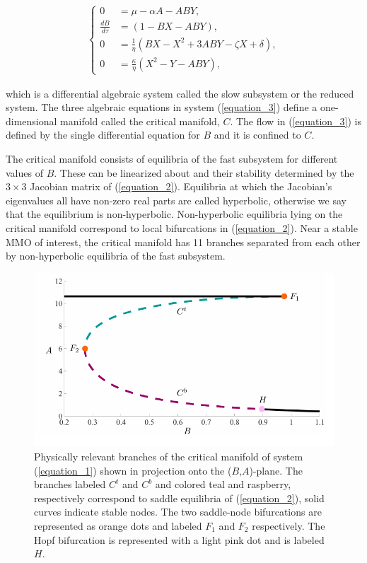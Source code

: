 \documentclass{ws-ijbc}
\begin{document}
 \begin{equation}
\begin{aligned}
\begin{cases}
0 &= \mu - \alpha A - ABY, \\
\frac{dB}{d\tau} &= (1-BX - ABY), \\
0 &= \frac{1}{\eta}(BX - X^2 +3ABY - \zeta X + \delta), \\
0 &= \frac{\kappa}{\eta}(X^2 - Y - ABY),
\end{cases}
\end{aligned}
\label{equation_3}
\end{equation}
    
\noindent
which is a differential algebraic system called the slow subsystem or the reduced system. The three algebraic equations in system (\ref{equation_3}) define a one-dimensional manifold called the critical manifold, $C$.  The flow in (\ref{equation_3}) is defined by the single differential equation for $B$ and it is confined to $C$.  

The critical manifold consists of equilibria of the fast subsystem for different values of $B$. These can be linearized about and their stability determined by the $3\times3$ Jacobian matrix of (\ref{equation_2}).  Equilibria at which the Jacobian's eigenvalues all have non-zero real parts are called hyperbolic, otherwise we say that the equilibrium is non-hyperbolic.  Non-hyperbolic equilibria lying on the critical manifold correspond to local bifurcations in (\ref{equation_2}).  Near a stable MMO of interest, the critical manifold has 11 branches separated from each other by non-hyperbolic equilibria of the fast subsystem.

\begin{figure}[!t]
\begin{center}
\includegraphics[page=1, width=\textwidth]{figures.pdf}
\end{center}
\caption{Physically relevant branches of the critical manifold of system (\ref{equation_1}) shown in projection onto the ($B$,$A$)-plane.  The branches labeled $C^t$ and $C^b$ and colored teal and raspberry, respectively correspond to saddle equilibria of (\ref{equation_2}), solid curves indicate stable nodes.  The two saddle-node bifurcations are represented as orange dots and labeled $F_1$ and $F_2$ respectively.  The Hopf bifurcation is represented with a light pink dot and is labeled $H$.}
\label{critical_figure}
\end{figure}
\end{document}
